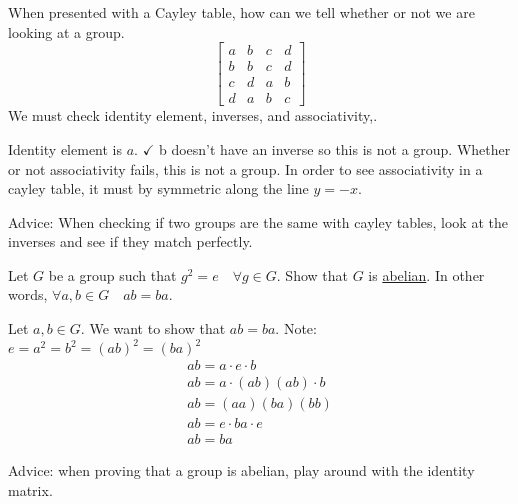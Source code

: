 \documentclass[11pt]{scrartcl}
\begin{document}
\begin{example}
  When presented with a Cayley table, how can we tell whether or not we are looking at a group.
  \[
    \begin{bmatrix}
      a & b & c & d \\
      b & b & c & d \\
      c & d & a & b \\
      d & a & b & c
    \end{bmatrix}
  \]
  We must check identity element, inverses, and associativity,.

  \begin{enumerate}
    \ii Identity element is $a$. $\checkmark$
    \ii b doesn't have an inverse so this is not a group.
    \ii Whether or not associativity fails, this is not a group. In order to see associativity in a cayley table, it must by symmetric along the line $y = -x$.
  \end{enumerate}

  Advice: When checking if two groups are the same with cayley tables, look at the inverses and see if they match perfectly.
\end{example}

\begin{exercise}
  Let $G$ be a group such that $g^2 = e \quad \forall g \in G$. Show that $G$ is \ul{abelian}. In other words, $\forall a, b \in G \quad ab = ba$.

  \begin{soln}
    Let $a, b\in G$. We want to show that $ab = ba$. Note: $e = a^2 = b^2 = (ab)^2 = (ba)^2$
    \begin{align*}
      ab = a \cdot e \cdot b \\
      ab = a \cdot (ab)(ab) \cdot b \\
      ab = (aa)(ba)(bb) \\
      ab = e \cdot ba \cdot e \\
      ab = ba
    \end{align*}
  \end{soln}
  Advice: when proving that a group is abelian, play around with the identity matrix.
\end{exercise}
\end{document}
